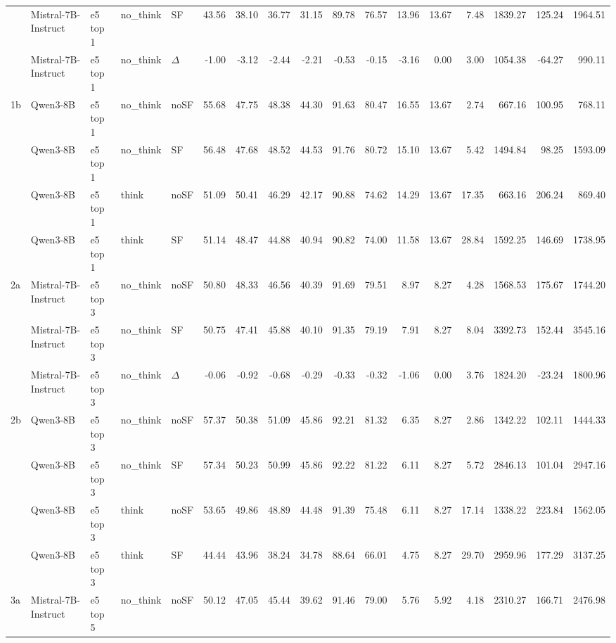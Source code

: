 \begin{landscape}
\begin{footnotesize}
\begin{longtable}{l l l l l r r r r r r r r r r r r}
 & Mistral-7B-Instruct & e5 top 1 & no\_think & SF & 43.56 & 38.10 & 36.77 & 31.15 & 89.78 & 76.57 & 13.96 & 13.67 & 7.48 & 1839.27 & 125.24 & 1964.51 \\
 & Mistral-7B-Instruct & e5 top 1 & no\_think & $\Delta$ & -1.00 & -3.12 & -2.44 & -2.21 & -0.53 & -0.15 & -3.16 & 0.00 & 3.00 & 1054.38 & -64.27 & 990.11 \\
1b & Qwen3-8B & e5 top 1 & no\_think & noSF & 55.68 & 47.75 & 48.38 & 44.30 & 91.63 & 80.47 & 16.55 & 13.67 & 2.74 & 667.16 & 100.95 & 768.11 \\
 & Qwen3-8B & e5 top 1 & no\_think & SF & 56.48 & 47.68 & 48.52 & 44.53 & 91.76 & 80.72 & 15.10 & 13.67 & 5.42 & 1494.84 & 98.25 & 1593.09 \\
 & Qwen3-8B & e5 top 1 & think & noSF & 51.09 & 50.41 & 46.29 & 42.17 & 90.88 & 74.62 & 14.29 & 13.67 & 17.35 & 663.16 & 206.24 & 869.40 \\
 & Qwen3-8B & e5 top 1 & think & SF & 51.14 & 48.47 & 44.88 & 40.94 & 90.82 & 74.00 & 11.58 & 13.67 & 28.84 & 1592.25 & 146.69 & 1738.95 \\
\midrule
2a & Mistral-7B-Instruct & e5 top 3 & no\_think & noSF & 50.80 & 48.33 & 46.56 & 40.39 & 91.69 & 79.51 & 8.97 & 8.27 & 4.28 & 1568.53 & 175.67 & 1744.20 \\
 & Mistral-7B-Instruct & e5 top 3 & no\_think & SF & 50.75 & 47.41 & 45.88 & 40.10 & 91.35 & 79.19 & 7.91 & 8.27 & 8.04 & 3392.73 & 152.44 & 3545.16 \\
 & Mistral-7B-Instruct & e5 top 3 & no\_think & $\Delta$ & -0.06 & -0.92 & -0.68 & -0.29 & -0.33 & -0.32 & -1.06 & 0.00 & 3.76 & 1824.20 & -23.24 & 1800.96 \\
2b & Qwen3-8B & e5 top 3 & no\_think & noSF & 57.37 & 50.38 & 51.09 & 45.86 & 92.21 & 81.32 & 6.35 & 8.27 & 2.86 & 1342.22 & 102.11 & 1444.33 \\
 & Qwen3-8B & e5 top 3 & no\_think & SF & 57.34 & 50.23 & 50.99 & 45.86 & 92.22 & 81.22 & 6.11 & 8.27 & 5.72 & 2846.13 & 101.04 & 2947.16 \\
 & Qwen3-8B & e5 top 3 & think & noSF & 53.65 & 49.86 & 48.89 & 44.48 & 91.39 & 75.48 & 6.11 & 8.27 & 17.14 & 1338.22 & 223.84 & 1562.05 \\
 & Qwen3-8B & e5 top 3 & think & SF & 44.44 & 43.96 & 38.24 & 34.78 & 88.64 & 66.01 & 4.75 & 8.27 & 29.70 & 2959.96 & 177.29 & 3137.25 \\
\midrule
3a & Mistral-7B-Instruct & e5 top 5 & no\_think & noSF & 50.12 & 47.05 & 45.44 & 39.62 & 91.46 & 79.00 & 5.76 & 5.92 & 4.18 & 2310.27 & 166.71 & 2476.98 \\

\end{longtable}
\end{footnotesize}
\end{landscape}
